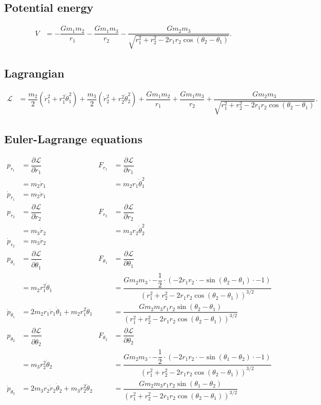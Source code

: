 \documentclass[12pt,a4paper,portrait]{article}
\begin{document}
	\subsection{Potential energy}
	\begin{align*}
		V &= -\dfrac{Gm_1m_2}{r_1} - \dfrac{Gm_1m_3}{r_2} - \dfrac{Gm_2 m_3}{\sqrt{r_1^2 + r_2^2 - 2r_1 r_2 \cos{(\theta_2-\theta_1)}}}.
	\end{align*}
	
	\subsection{Lagrangian}
	\begin{align*}
		\mathcal{L} &= \dfrac{m_2}{2} (\dot{r}_1^2 + r_1^2 \dot{\theta}_1^2) + \dfrac{m_3}{2}(\dot{r}_2^2 + r_2^2 \dot{\theta}_2^2) + \dfrac{Gm_1m_2}{r_1} + \dfrac{Gm_1m_3}{r_2} + \dfrac{Gm_2 m_3}{\sqrt{r_1^2 + r_2^2 - 2r_1 r_2 \cos{(\theta_2-\theta_1)}}}.
	\end{align*}
	
	\subsection{Euler-Lagrange equations}
	\begin{align*}
		p_{r_1} &= \dfrac{\partial \mathcal{L}}{\partial \dot{r}_1} & F_{r_1} &= \dfrac{\partial \mathcal{L}}{\partial r_1} \\
		&= m_2\dot{r}_1 & &= m_2 r_1\dot{\theta}_1^2\\
		\dot{p}_{r_1} &= m_2\ddot{r}_1 \\
		p_{r_2} &= \dfrac{\partial \mathcal{L}}{\partial \dot{r}_2} & F_{r_2} &= \dfrac{\partial \mathcal{L}}{\partial r_2} \\
		&= m_3\dot{r}_2 & &= m_3 r_2\dot{\theta}_2^2\\
		\dot{p}_{r_2} &= m_3\ddot{r}_2 \\
		p_{\theta_1} &= \dfrac{\partial \mathcal{L}}{\partial \dot{\theta}_1} & F_{\theta_1} &= \dfrac{\partial \mathcal{L}}{\partial \theta_1}\\
		&= m_2 r_1^2 \dot{\theta}_1 & &= \dfrac{Gm_2 m_3\cdot-\dfrac{1}{2}\cdot (-2r_1r_2\cdot -\sin{(\theta_2-\theta_1)\cdot -1})}{(r_1^2 + r_2^2 - 2r_1 r_2 \cos{(\theta_2-\theta_1)})^{3/2}} \\
		\dot{p}_{\theta_1} &= 2m_2 r_1\dot{r}_1 \dot{\theta}_1 + m_2 r_1^2 \ddot{\theta}_1 & &= \dfrac{Gm_2 m_3 r_1 r_2 \sin{(\theta_2-\theta_1)}}{(r_1^2 + r_2^2 - 2r_1 r_2 \cos{(\theta_2-\theta_1)})^{3/2}} \\
		p_{\theta_2} &= \dfrac{\partial \mathcal{L}}{\partial \dot{\theta}_2} & F_{\theta_2} &= \dfrac{\partial \mathcal{L}}{\partial \theta_2}\\
		&= m_3 r_2^2 \dot{\theta}_2 & &= \dfrac{Gm_2m_3\cdot -\dfrac{1}{2} \cdot (-2r_1r_2 \cdot -\sin{(\theta_1-\theta_2)\cdot -1})}{(r_1^2 + r_2^2 - 2r_1 r_2 \cos{(\theta_2-\theta_1)})^{3/2}}\\
		\dot{p}_{\theta_2} &= 2m_3 r_2 \dot{r}_2 \dot{\theta}_2 + m_3r_2^2 \ddot{\theta}_2 & &= \dfrac{Gm_2m_3r_1r_2 \sin{(\theta_1-\theta_2)}}{(r_1^2 + r_2^2 - 2r_1 r_2 \cos{(\theta_2-\theta_1)})^{3/2}}
	\end{align*}
		
\end{document}
